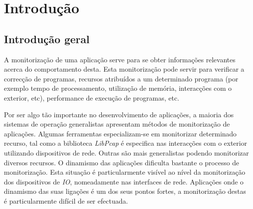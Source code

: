\chapter{Introdução}\label{cap:introducao}




\section{Introdução geral} \label{sect:introducao}

A monitorização de uma aplicação serve para se obter informações relevantes acerca do comportamento desta.
Esta monitorização pode servir para verificar a correcção de programas, recursos atribuídos a um determinado programa (por exemplo tempo de processamento, utilização de memória, interacções com o exterior, etc), performance de execução de programas, etc.

Por ser algo tão importante no desenvolvimento de aplicações, a maioria dos sistemas de operação generalistas apresentam métodos de monitorização de aplicações.
Algumas ferramentas especializam-se em monitorizar determinado recurso, tal como a biblioteca \textit{LibPcap} é especifica nas interacções com o exterior utilizando dispositivos de rede.
Outras são mais generalistas podendo monitorizar diversos recursos.
O dinamismo das aplicações dificulta bastante o processo de monitorização.
Esta situação é particularmente visível ao nível da monitorização dos dispositivos de \textit{IO}, nomeadamente nas interfaces de rede.
Aplicações onde o dinamismo das suas ligações é um dos seus pontos fortes, a monitorização destas é particularmente difícil de ser efectuada.

